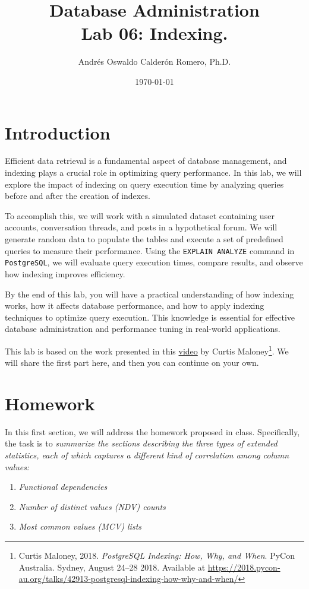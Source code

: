 \documentclass{article}
\title{Database Administration \\ Lab 06: Indexing.}
\author{Andrés Oswaldo Calderón Romero, Ph.D.}
\date{\today}
\begin{document}
\maketitle

\section{Introduction}

Efficient data retrieval is a fundamental aspect of database management, and indexing plays a crucial role in optimizing query performance. In this lab, we will explore the impact of indexing on query execution time by analyzing queries before and after the creation of indexes.

To accomplish this, we will work with a simulated dataset containing user accounts, conversation threads, and posts in a hypothetical forum. We will generate random data to populate the tables and execute a set of predefined queries to measure their performance. Using the \texttt{EXPLAIN ANALYZE} command in \texttt{PostgreSQL}, we will evaluate query execution times, compare results, and observe how indexing improves efficiency.

By the end of this lab, you will have a practical understanding of how indexing works, how it affects database performance, and how to apply indexing techniques to optimize query execution. This knowledge is essential for effective database administration and performance tuning in real-world applications.

This lab is based on the work presented in this \href{https://youtu.be/clrtT_4WBAw?si=Q5Rmt7YVsykuS715}{video} by Curtis Maloney\footnote{Curtis Maloney, 2018. \textit{PostgreSQL Indexing: How, Why, and When}. PyCon Australia. Sydney, August 24–28 2018. Available at \url{https://2018.pycon-au.org/talks/42913-postgresql-indexing-how-why-and-when/}}. We will share the first part here, and then you can continue on your own.

\section{Homework}
In this first section, we will address the homework proposed in class. Specifically, the task is to \textit{summarize the sections describing the three types of extended statistics, each of which captures a different kind of correlation among column values:}

\begin{enumerate}
  \item \textit{Functional dependencies}
  \item \textit{Number of distinct values (NDV) counts}
  \item \textit{Most common values (MCV) lists}
\end{enumerate}
\end{document}
